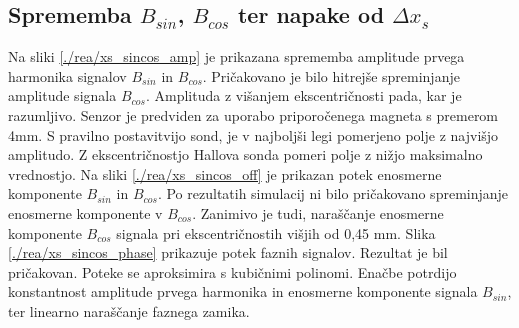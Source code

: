 \subsection{Sprememba $B_{sin}$, $B_{cos}$ ter napake od $\Delta x_s$}
Na sliki \ref{./rea/xs_sincos_amp} je prikazana sprememba amplitude prvega harmonika signalov $B_{sin}$ in $B_{cos}$. Pričakovano je bilo hitrejše spreminjanje amplitude signala $B_{cos}$. Amplituda z višanjem ekscentričnosti pada, kar je razumljivo. Senzor je predviden za uporabo priporočenega magneta s premerom 4mm. S pravilno postavitvijo sond, je v najboljši legi pomerjeno polje z najvišjo amplitudo. Z ekscentričnostjo Hallova sonda pomeri polje z nižjo maksimalno vrednostjo. Na sliki \ref{./rea/xs_sincos_off} je prikazan potek enosmerne komponente $B_{sin}$ in $B_{cos}$. Po rezultatih simulacij ni bilo pričakovano spreminjanje enosmerne komponente v $B_{cos}$. Zanimivo je tudi, naraščanje enosmerne komponente $B_{cos}$ signala pri ekscentričnostih višjih od 0,45 mm. Slika \ref{./rea/xs_sincos_phase} prikazuje potek faznih signalov. Rezultat je bil pričakovan.%
Poteke se aproksimira s kubičnimi polinomi. Enačbe potrdijo konstantnost amplitude prvega harmonika in enosmerne komponente signala $B_{sin}$, ter linearno naraščanje faznega zamika.

